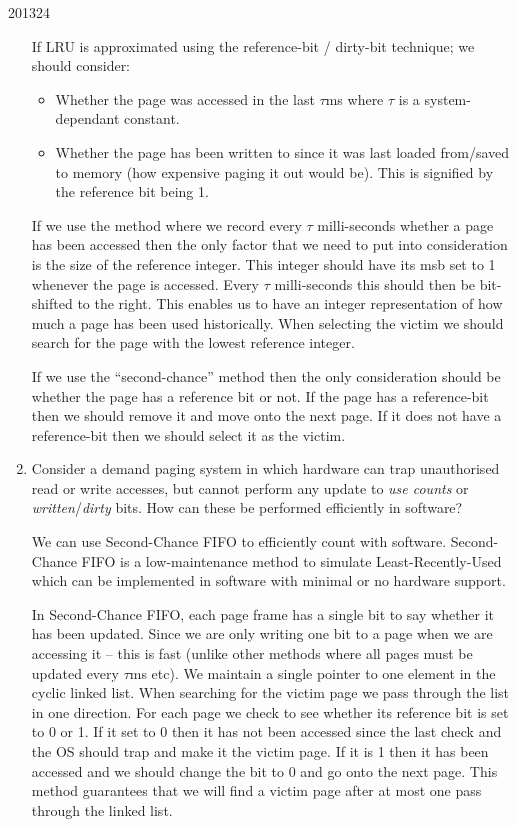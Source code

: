\documentclass[10pt,\jkfside,a4paper]{article}
\begin{document}
\begin{examquestion}{2013}{2}{4}
\begin{enumerate}
If LRU is approximated using the reference-bit / dirty-bit technique; we should consider:
\begin{itemize}

\item Whether the page was accessed in the last $\tau$ms where $\tau$ is a system-dependant constant.

\item Whether the page has been written to since it was last loaded from/saved to memory (how 
expensive paging it out would be). This is signified by the reference bit being 1.

\end{itemize}

If we use the method where we record every $\tau$ milli-seconds whether a page has been accessed then the 
only factor that we need to put into consideration is the size of the reference integer. This integer 
should have its msb set to 1 whenever the page is accessed. Every $\tau$ milli-seconds this should then be 
bit-shifted to the right. This enables us to have an integer representation of how much a page has been 
used historically. When selecting the victim we should search for the page with the lowest reference integer.

If we use the ``second-chance'' method then the only consideration should be whether the page has a 
reference bit or not. If the page has a reference-bit then we should remove it and move onto the 
next page. If it does not have a reference-bit then we should select it as the victim.

\item Consider a demand paging system in which hardware can trap unauthorised read
or write accesses, but cannot perform any update to \textit{use counts} or \textit{written}/\textit{dirty}
bits. How can these be performed efficiently in software?

We can use Second-Chance FIFO to efficiently count with software. 
Second-Chance FIFO is a low-maintenance method to simulate Least-Recently-Used 
which can be implemented in software with minimal or no hardware support. 

In Second-Chance FIFO, each page frame has a single bit to say whether 
it has been updated. Since we are only writing one bit to a page when we are accessing 
it -- this is fast (unlike other methods where all pages must be updated every $\tau$ms etc). 
We maintain a single pointer to one element in the cyclic linked list. When searching 
for the victim page we pass through the list in one direction. For each page we check to see 
whether its reference bit is set to 0 or 1. If it set to 0 then it has not been accessed 
since the last check and the OS should trap and make it the victim page. If it is 1 then it 
has been accessed and we should change the bit to 0 and go onto the next page. This method 
guarantees that we will find a victim page after at most one pass through the linked list. 


\end{enumerate}
\end{examquestion}
\end{document}
